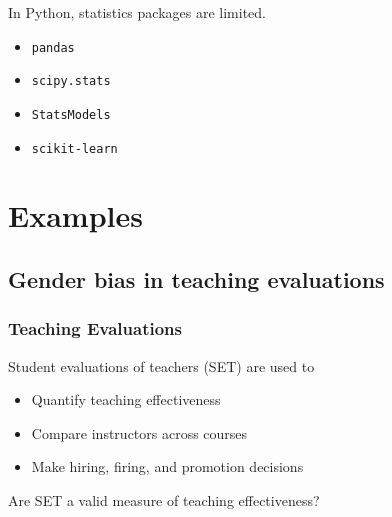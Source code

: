 \documentclass{beamer}
\begin{document}
{\begin{multicols}{2}
\begin{itemize}
\end{itemize}
\end{multicols}
\vspace{20pt}
In Python, statistics packages are limited.
\begin{multicols}{2}
\begin{itemize}
\item \texttt{pandas} %
\item \texttt{scipy.stats} %
\item \texttt{StatsModels} %
\item \texttt{scikit-learn} %
\end{itemize}
\end{multicols}

}


\section[Examples]{Examples}
\subsection[Teaching evaluations]{Gender bias in teaching evaluations}


\frame
{
  \frametitle{Teaching Evaluations}
 \begin{center}
 \Large{ Student evaluations of teachers (SET) are used to} \\
  \begin{itemize}
  \item Quantify teaching effectiveness
  \item Compare instructors across courses
  \item Make hiring, firing, and promotion decisions  
  \end{itemize}
  \vfill
Are SET a valid measure of teaching effectiveness? 
\end{center}
}
\end{document}
